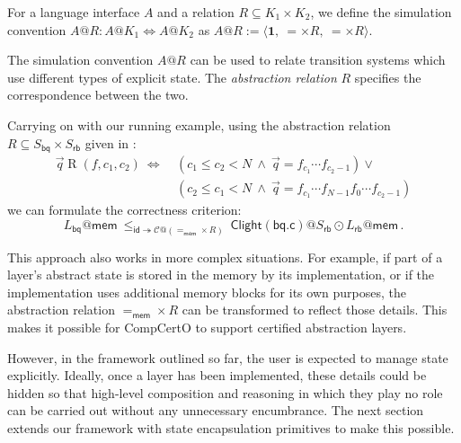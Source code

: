 \documentclass[acmsmall,screen,review,anonymous]{acmart}
\newcommand{\kw}[1]{\ensuremath{ \mathsf{#1} }}
\begin{document}
\begin{definition}
For a language interface $A$ and a relation $R \subseteq K_1 \times K_2$,
we define the simulation convention $A@R : A@K_1 \Leftrightarrow A@K_2$ as
$
  A@R := \langle \mathbf{1}, \: {=} \times R, \: {=} \times R \rangle
$.
\end{definition}

The simulation convention $A@R$
can be used to relate transition systems which use
different types of explicit state.
The \emph{abstraction relation} $R$
specifies the correspondence between the two.

\begin{example}[Correctness of \kw{bq.c}] \label{ex:bqcorrect}
Carrying on with our running example,
using the abstraction relation $R \subseteq S_\kw{bq} \times S_\kw{rb}$
given in \citet{rbgs-cal}:
\begin{align*}
  \vec{q} \mathrel{R} (f, c_1, c_2) \:\Leftrightarrow\: {}
    & (c_1 \le c_2 < N \:\wedge\: \vec{q} = f_{c_1} \cdots f_{c_2-1}) \vee {} \\
    & (c_2 \le c_1 < N \:\wedge\: \vec{q} = f_{c_1} \cdots f_{N-1} f_0 \cdots f_{c_2 - 1})
\end{align*}
we can formulate the correctness criterion:
\[
  L_\kw{bq}@\kw{mem}
  \:\le_{\kw{id} \twoheadrightarrow \mathcal{C}@({=}_\kw{mem} \times R)}\:
  \kw{Clight}(\kw{bq.c})@S_\kw{rb} \odot
  L_\kw{rb}@\kw{mem}
  \,.
\]
\end{example}

This approach also works in more complex situations.
For example,
if part of a layer's abstract state is
stored in the memory by its implementation,
or if the implementation uses additional memory blocks
for its own purposes,
the abstraction relation ${=}_\kw{mem} \times R$
can be transformed to reflect those details.
This makes it possible for CompCertO
to support certified abstraction layers.

However,
in the framework outlined so far,
the user is expected to manage state explicitly.
Ideally,
once a layer has been implemented,
these details could be hidden so that
high-level composition and reasoning
in which they play no role
can be carried out without any unnecessary
encumbrance.
The next section
extends our framework
with state encapsulation primitives
to make this possible.

\end{document}

